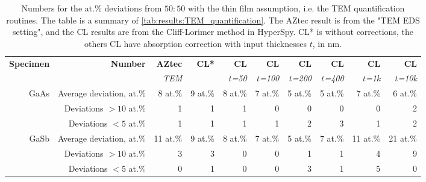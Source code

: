 \begin{table}[phtb]
    \begin{center}
        \caption{
            Numbers for the at.\% deviations from $50:50$ with the thin film assumption, i.e. the TEM quantification routines.
            The table is a summary of \cref{tab:results:TEM_quantification}.
            The AZtec result is from the "TEM EDS setting", and the CL results are from the Cliff-Lorimer method in HyperSpy.
            CL* is without corrections, the others CL have absorption correction with input thicknesses $t$, in nm.
        }
        \label{tab:results:TEM_quantification_stats}
        \begin{tabular}{rrrrrrrrrr}
            \hline
            \textbf{Specimen} & \textbf{Number}          & \textbf{AZtec} & \textbf{CL*} & \textbf{CL}   & \textbf{CL}    & \textbf{CL}    & \textbf{CL}    & \textbf{CL}   & \textbf{CL}    \\
            \emph{}           & \emph{}                  & \emph{TEM}     & \emph{}      & \emph{$t$=50} & \emph{$t$=100} & \emph{$t$=200} & \emph{$t$=400} & \emph{$t$=1k} & \emph{$t$=10k} \\
            \hline
            GaAs              & Average deviation, at.\% & 8 at.\%        & 9 at.\%      & 8 at.\%       & 7 at.\%        & 5 at.\%        & 5 at.\%        & 7 at.\%       & 6 at.\%        \\
                              & Deviations $>10$ at.\%   & 1              & 1            & 1             & 0              & 0              & 0              & 0             & 2              \\
                              & Deviations  $<5$  at.\%  & 1              & 1            & 1             & 1              & 2              & 3              & 1             & 2              \\
            \hline
            GaSb              & Average deviation, at.\% & 11 at.\%       & 9 at.\%      & 8 at.\%       & 7 at.\%        & 5 at.\%        & 7 at.\%        & 11 at.\%      & 21 at.\%       \\
                              & Deviations $>10$ at.\%   & 3              & 3            & 0             & 0              & 1              & 1              & 4             & 9              \\
                              & Deviations  $<5$  at.\%  & 0              & 1            & 0             & 0              & 3              & 1              & 5             & 0              \\
            \hline
        \end{tabular}
    \end{center}
\end{table}

